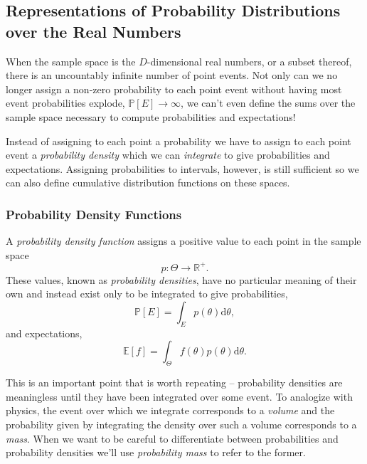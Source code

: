 \documentclass[11pt, oneside]{article}
\newcommand{\dd}{ \mathrm{d} }
\newcommand{\PP}{ \mathbb{P} }
\begin{document}
\subsection{Representations of Probability Distributions over the Real
Numbers}

When the sample space is the $D$-dimensional real numbers, or
a subset thereof, there is an uncountably infinite number of point events.  
Not only can we no longer assign a non-zero probability to each point 
event without having most event probabilities explode, $\PP \! \left[ E \right]
\rightarrow \infty$, we can't even define the sums over the sample space 
necessary to compute probabilities and expectations!  

Instead of assigning to each point a probability we have to assign  
to each point event a \emph{probability density}  which we can 
\emph{integrate} to give probabilities and expectations.  Assigning 
probabilities to intervals, however, is still sufficient so we can also 
define cumulative distribution functions on these spaces.

\subsubsection{Probability Density Functions}

A \emph{probability density function} assigns a positive value to each
point in the sample space
%
\begin{equation*}
p : \Theta \rightarrow \mathbb{R}^{+}.
\end{equation*}
%
These values, known as \emph{probability densities}, have no particular 
meaning of their own and instead exist only to be integrated to give 
probabilities,
%
\begin{equation*}
\PP \! \left[ E \right]
=
\int_{E} p \! \left( \theta \right) \dd \theta,
\end{equation*}
%
and expectations,
%
\begin{equation*}
\mathbb{E} \! \left[ f \right]
=
\int_{\Theta} f \! \left( \theta \right) p \! \left( \theta \right) \dd \theta.
\end{equation*}

This is an important point that is worth repeating -- probability densities 
are meaningless until they have been integrated over some event.  To 
analogize with physics, the event over which we integrate corresponds 
to a \emph{volume} and the probability given by integrating the density 
over such a volume corresponds to a \emph{mass}.  When we want to 
be careful to differentiate between probabilities and probability densities 
we'll use \emph{probability mass} to refer to the former.
\end{document}
